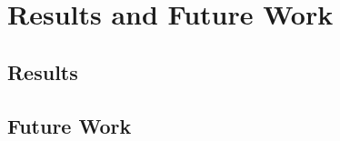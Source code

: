 \chapter{Results and Future Work}
\label{capitolo8}
\thispagestyle{empty}
\section{Results}

\section{Future Work}

